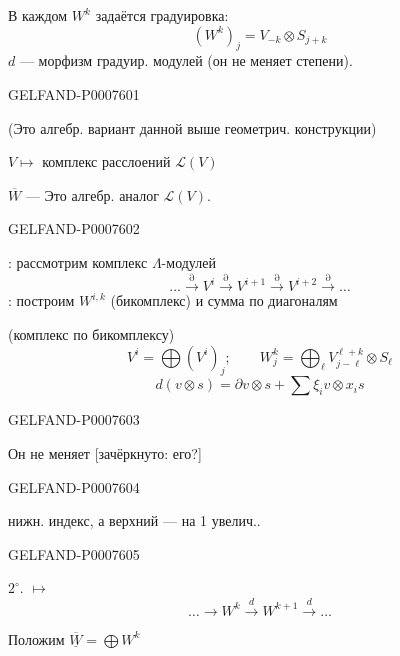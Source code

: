 В каждом \(W^k\) задаётся градуировка:
\[
(W^k)_j=V_{-k}\otimes S_{j+k}
\]
\(d\) --- морфизм градуир. модулей (он не меняет степени).


\begin{GelfandAdjacentEvidence}{GELFAND-P000760}{1}

(Это алгебр. вариант данной выше геометрич. конструкции)

\(V\longmapsto\) комплекс расслоений \(\mathcal L(V)\)

\(\overline W\) --- Это алгебр. аналог \(\mathcal L(V)\).
\end{GelfandAdjacentEvidence}
\begin{GelfandAdjacentEvidence}{GELFAND-P000760}{2}


: рассмотрим комплекс \(\Lambda\)-модулей
\[
\ldots\xrightarrow{\partial}V^i\xrightarrow{\partial}V^{i+1}
\xrightarrow{\partial}V^{i+2}\xrightarrow{\partial}\ldots
\]
: построим \(W^{i,k}\) (бикомплекс) и сумма по диагоналям

(комплекс по бикомплексу)
\[
V^i=\bigoplus(V^i)_j;\qquad
W^k_j=\bigoplus_{\ell} V^{\ell+k}_{j-\ell}\otimes S_\ell
\]
\[
d(v\otimes s)=\partial v\otimes s+\sum\xi_i v\otimes x_i s
\]
\end{GelfandAdjacentEvidence}
\begin{GelfandAdjacentEvidence}{GELFAND-P000760}{3}


Он не меняет [зачёркнуто: его?]
\end{GelfandAdjacentEvidence}
\begin{GelfandAdjacentEvidence}{GELFAND-P000760}{4}

нижн. индекс, а верхний — на 1 увелич..

\end{GelfandAdjacentEvidence}
\begin{GelfandAdjacentEvidence}{GELFAND-P000760}{5}


\(2^\circ\).
\(\longmapsto\)
\[
\ldots\longrightarrow W^k\xrightarrow{d}W^{k+1}\xrightarrow{d}\ldots
\]

Положим \(\underline{\overline W}=\bigoplus W^k\)
\end{GelfandAdjacentEvidence}
